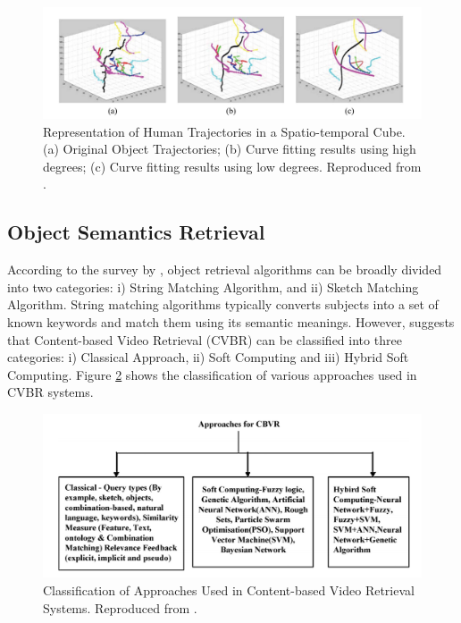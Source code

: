 \begin{figure}[hbt!]
  \centering
  \includegraphics[width=1\textwidth]{image/lit/spatiotemporal2.PNG}
  \caption[Representation of Human Trajectories in a Spatio-temporal Cube. (a)
  Original Object Trajectories; (b) Curve fitting results using high degrees;
  (c) Curve fitting results using low degrees] {Representation of Human
  Trajectories in a Spatio-temporal Cube. (a) Original Object Trajectories; (b)
  Curve fitting results using high degrees; (c) Curve fitting results using low
  degrees. Reproduced from .}
  \label{fig:spatiocube2}
\end{figure}



\subsection{Object Semantics Retrieval}

According to the survey by \cite{chandran2017review}, object retrieval
algorithms can be broadly divided into two categories: i) String Matching
Algorithm, and ii) Sketch Matching Algorithm. String matching algorithms
typically converts subjects into a set of known keywords and match them using
its semantic meanings. However,  suggests that
Content-based Video Retrieval (CVBR) can be classified into three categories: i)
Classical Approach, ii) Soft Computing and iii) Hybrid Soft Computing. Figure
\ref{fig:cvbr} shows the classification of various approaches used in CVBR
systems.

\begin{figure}[hbt!]
  \centering
  \includegraphics[width=.9\textwidth]{image/lit/cvbr.PNG}
  \caption[Classification of Approaches Used in Content-based Video Retrieval
  Systems] {Classification of Approaches Used in Content-based Video Retrieval
  Systems. Reproduced from .}
  \label{fig:cvbr}
\end{figure}

